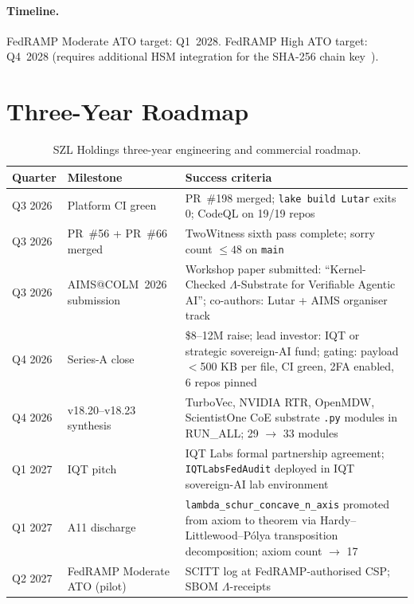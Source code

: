 \paragraph{Timeline.}
FedRAMP Moderate ATO target: Q1~2028.
FedRAMP High ATO target: Q4~2028 (requires additional HSM integration
for the SHA-256 chain key~\cite{nist2012sha,bertoni2013keccak}).


\section{Three-Year Roadmap}
\label{sec:roadmap}

\begin{table}[ht]
\centering
\caption{SZL Holdings three-year engineering and commercial roadmap.}
\label{tab:roadmap}
\small
\renewcommand{\arraystretch}{1.35}
\begin{tabular}{lp{3.2cm}p{6.5cm}}
\hline
\textbf{Quarter} & \textbf{Milestone} & \textbf{Success criteria} \\
\hline
Q3 2026 & Platform CI green
  & PR~\#198 merged; \texttt{lake build Lutar} exits 0;
    CodeQL on 19/19 repos \\
Q3 2026 & PR~\#56 + PR~\#66 merged
  & TwoWitness sixth pass complete; sorry count \(\leq 48\) on
    \texttt{main} \\
Q3 2026 & AIMS@COLM~2026 submission~\cite{aims2026colm}
  & Workshop paper submitted: ``Kernel-Checked \(\Lambda\)-Substrate
    for Verifiable Agentic AI''; co-authors: Lutar + AIMS organiser
    track \\
Q4 2026 & Series-A close
  & \$8--12M raise; lead investor: IQT or strategic sovereign-AI fund;
    gating: payload \(<\)500 KB per file, CI green, 2FA enabled,
    6 repos pinned \\
Q4 2026 & v18.20--v18.23 synthesis
  & TurboVec, NVIDIA RTR, OpenMDW, ScientistOne CoE substrate
    \texttt{.py} modules in RUN\_ALL; 29 \(\to\) 33 modules \\
Q1 2027 & IQT pitch
  & IQT Labs formal partnership agreement; \texttt{IQTLabsFedAudit}
    deployed in IQT sovereign-AI lab environment \\
Q1 2027 & A11 discharge
  & \texttt{lambda\_schur\_concave\_n\_axis} promoted from axiom to
    theorem via Hardy--Littlewood--P\'olya transposition decomposition;
    axiom count \(\to\) 17 \\
Q2 2027 & FedRAMP Moderate ATO (pilot)
  & SCITT log at FedRAMP-authorised CSP; SBOM \(\Lambda\)-receipts

\end{tabular}
\end{table}
